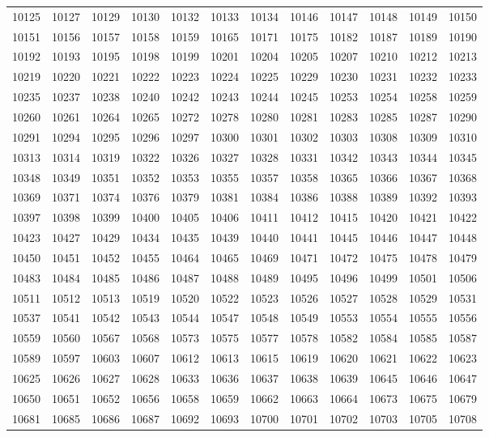 \begin{center}
\begin{longtable}{llllllllllll}
10125 &10127 &10129 &10130 &10132 &10133 &10134 &10146 &10147 &10148 &10149 &10150 \\
10151 &10156 &10157 &10158 &10159 &10165 &10171 &10175 &10182 &10187 &10189 &10190 \\
10192 &10193 &10195 &10198 &10199 &10201 &10204 &10205 &10207 &10210 &10212 &10213 \\
10219 &10220 &10221 &10222 &10223 &10224 &10225 &10229 &10230 &10231 &10232 &10233 \\
10235 &10237 &10238 &10240 &10242 &10243 &10244 &10245 &10253 &10254 &10258 &10259 \\
10260 &10261 &10264 &10265 &10272 &10278 &10280 &10281 &10283 &10285 &10287 &10290 \\
10291 &10294 &10295 &10296 &10297 &10300 &10301 &10302 &10303 &10308 &10309 &10310 \\
10313 &10314 &10319 &10322 &10326 &10327 &10328 &10331 &10342 &10343 &10344 &10345 \\
10348 &10349 &10351 &10352 &10353 &10355 &10357 &10358 &10365 &10366 &10367 &10368 \\
10369 &10371 &10374 &10376 &10379 &10381 &10384 &10386 &10388 &10389 &10392 &10393 \\
10397 &10398 &10399 &10400 &10405 &10406 &10411 &10412 &10415 &10420 &10421 &10422 \\
10423 &10427 &10429 &10434 &10435 &10439 &10440 &10441 &10445 &10446 &10447 &10448 \\
10450 &10451 &10452 &10455 &10464 &10465 &10469 &10471 &10472 &10475 &10478 &10479 \\
10483 &10484 &10485 &10486 &10487 &10488 &10489 &10495 &10496 &10499 &10501 &10506 \\
10511 &10512 &10513 &10519 &10520 &10522 &10523 &10526 &10527 &10528 &10529 &10531 \\
10537 &10541 &10542 &10543 &10544 &10547 &10548 &10549 &10553 &10554 &10555 &10556 \\
10559 &10560 &10567 &10568 &10573 &10575 &10577 &10578 &10582 &10584 &10585 &10587 \\
10589 &10597 &10603 &10607 &10612 &10613 &10615 &10619 &10620 &10621 &10622 &10623 \\
10625 &10626 &10627 &10628 &10633 &10636 &10637 &10638 &10639 &10645 &10646 &10647 \\
10650 &10651 &10652 &10656 &10658 &10659 &10662 &10663 &10664 &10673 &10675 &10679 \\
10681 &10685 &10686 &10687 &10692 &10693 &10700 &10701 &10702 &10703 &10705 &10708 \\

\end{longtable}
\end{center}
